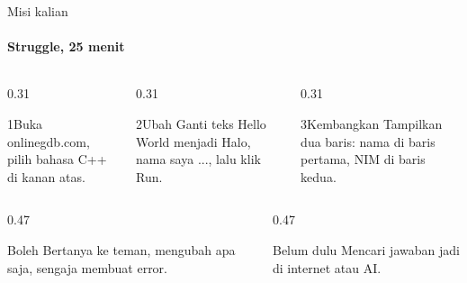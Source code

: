 \documentclass[t]{beamer}
\begin{document}

\begin{frame}{Misi kalian}
\framesubtitle{Struggle, 25 menit}
\begin{columns}[T]
\begin{column}{0.31\textwidth}
\begin{Langkah}{1}{Buka}
onlinegdb.com, pilih bahasa C++ di kanan atas.
\end{Langkah}
\end{column}
\begin{column}{0.31\textwidth}
\begin{Langkah}{2}{Ubah}
Ganti teks Hello World menjadi Halo, nama saya ..., lalu klik Run.
\end{Langkah}
\end{column}
\begin{column}{0.31\textwidth}
\begin{Langkah}{3}{Kembangkan}
Tampilkan dua baris: nama di baris pertama, NIM di baris kedua.
\end{Langkah}
\end{column}
\end{columns}
\vspace{8pt}
\begin{columns}[T]
\begin{column}{0.47\textwidth}
\begin{Blok}{Boleh}
Bertanya ke teman, mengubah apa saja, sengaja membuat error.
\end{Blok}
\end{column}
\begin{column}{0.47\textwidth}
\begin{BlokAlert}{Belum dulu}
Mencari jawaban jadi di internet atau AI.
\end{BlokAlert}
\end{column}
\end{columns}
\end{frame}
\end{document}
